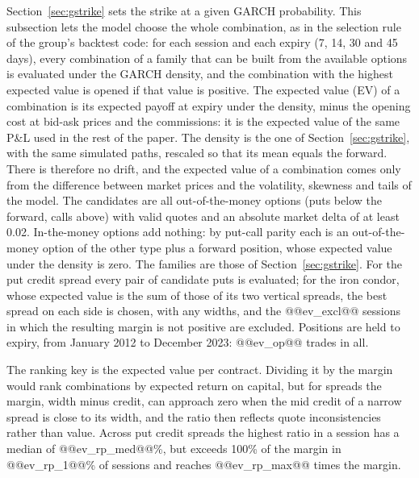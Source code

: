 \documentclass[11pt,a4paper]{article}
\begin{document}
Section~\ref{sec:gstrike} sets the strike at a given GARCH probability. This subsection lets the model choose the whole combination, as in the selection rule of the group's backtest code: for each session and each expiry (7, 14, 30 and 45 days), every combination of a family that can be built from the available options is evaluated under the GARCH density, and the combination with the highest expected value is opened if that value is positive. The expected value (EV) of a combination is its expected payoff at expiry under the density, minus the opening cost at bid-ask prices and the commissions: it is the expected value of the same P\&L used in the rest of the paper. The density is the one of Section~\ref{sec:gstrike}, with the same simulated paths, rescaled so that its mean equals the forward. There is therefore no drift, and the expected value of a combination comes only from the difference between market prices and the volatility, skewness and tails of the model. The candidates are all out-of-the-money options (puts below the forward, calls above) with valid quotes and an absolute market delta of at least 0.02. In-the-money options add nothing: by put-call parity each is an out-of-the-money option of the other type plus a forward position, whose expected value under the density is zero. The families are those of Section~\ref{sec:gstrike}. For the put credit spread every pair of candidate puts is evaluated; for the iron condor, whose expected value is the sum of those of its two vertical spreads, the best spread on each side is chosen, with any widths, and the @@ev_excl@@ sessions in which the resulting margin is not positive are excluded. Positions are held to expiry, from January 2012 to December 2023: @@ev_op@@ trades in all.

The ranking key is the expected value per contract. Dividing it by the margin would rank combinations by expected return on capital, but for spreads the margin, width minus credit, can approach zero when the mid credit of a narrow spread is close to its width, and the ratio then reflects quote inconsistencies rather than value. Across put credit spreads the highest ratio in a session has a median of @@ev_rp_med@@\%, but exceeds 100\% of the margin in @@ev_rp_1@@\% of sessions and reaches @@ev_rp_max@@ times the margin.
\end{document}
